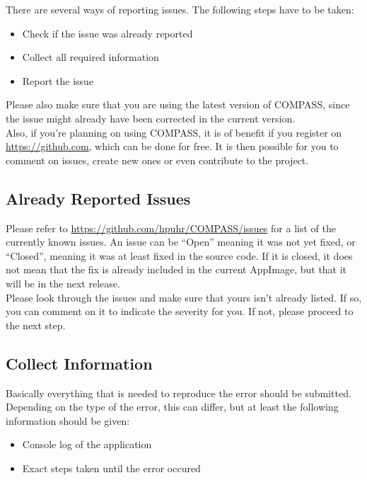 There are several ways of reporting issues. The following steps have to be taken:

\begin{itemize}  
\item Check if the issue was already reported
\item Collect all required information
\item Report the issue
\end{itemize} 

Please also make sure that you are using the latest version of COMPASS, since the issue might already have been corrected in the current version. \\

Also, if you're planning on using COMPASS, it is of benefit if you register on \url{https://github.com}, which can be done for free. It is then possible for you to comment on issues, create new ones or even contribute to the project.

\subsection{Already Reported Issues}

Please refer to \url{https://github.com/hpuhr/COMPASS/issues} for a list of the currently known issues. An issue can be ``Open'' meaning it was not yet fixed, or ``Closed'', meaning it was at least fixed in the source code. If it is closed, it does not mean that the fix is already included in the current AppImage, but that it will be in the next release. \\

Please look through the issues and make sure that yours isn't already listed. If so, you can comment on it to indicate the severity for you. If not, please proceed to the next step.

\subsection{Collect Information}

Basically everything that is needed to reproduce the error should be submitted. Depending on the type of the error, this can differ, but at least the following information should be given:

\begin{itemize}  
\item Console log of the application
\item Exact steps taken until the error occured
\end{itemize} 

